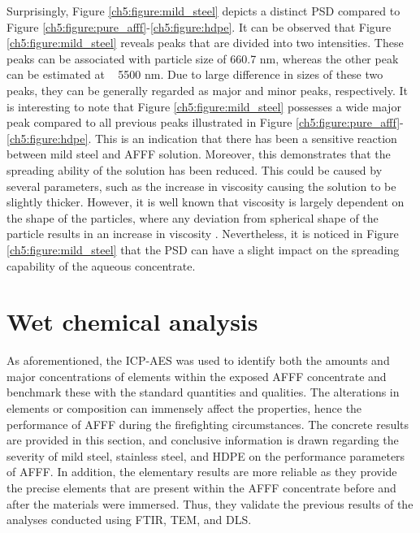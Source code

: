 \documentclass[12pt]{report}
\begin{document}
Surprisingly, Figure \ref{ch5:figure:mild_steel} depicts a distinct PSD compared to Figure \ref{ch5:figure:pure_afff}-\ref{ch5:figure:hdpe}. It can be observed that Figure \ref{ch5:figure:mild_steel} reveals peaks that are divided into two intensities. These peaks can be associated with particle size of 660.7 nm, whereas the other peak can be estimated at ~ 5500 nm.  Due to large difference in sizes of these two peaks, they can be generally regarded as major and minor peaks, respectively.  It is interesting to note that Figure \ref{ch5:figure:mild_steel} possesses a wide major peak compared to all previous peaks illustrated in Figure \ref{ch5:figure:pure_afff}-\ref{ch5:figure:hdpe}. This is an indication that there has been a sensitive reaction between mild steel and AFFF solution. Moreover, this demonstrates that the spreading ability of the solution has been reduced. This could be caused by several parameters, such as the increase in viscosity causing the solution to be slightly thicker. However, it is well known that viscosity is largely dependent on the shape of the particles, where any deviation from spherical shape of the particle results in an increase in viscosity \cite{klein2011transmission}. Nevertheless, it is noticed in Figure \ref{ch5:figure:mild_steel} that the PSD can have a slight impact on the spreading capability of the aqueous concentrate.

\section{Wet chemical analysis}
As aforementioned, the ICP-AES was used to identify both the amounts and major concentrations of elements within the exposed AFFF concentrate and benchmark these with the standard quantities and qualities. The alterations in elements or composition can immensely affect the properties, hence the performance of AFFF during the firefighting circumstances. The concrete results are provided in this section, and conclusive information is drawn regarding the severity of mild steel, stainless steel, and HDPE on the performance parameters of AFFF. In addition, the elementary results are more reliable as they provide the precise elements that are present within the AFFF concentrate before and after the materials were immersed. Thus, they validate the previous results of the analyses conducted using FTIR, TEM, and DLS.
\end{document}
